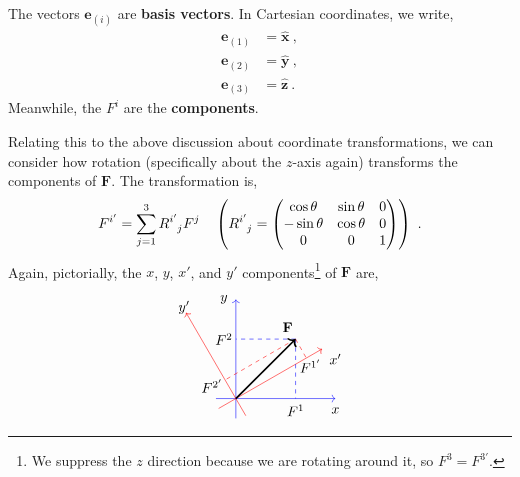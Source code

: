 \documentclass[11pt]{article}
\begin{document}
The vectors $\textbf{e}_{(i)}$ are \textbf{basis vectors}. In Cartesian coordinates, we write,
\begin{align}
\textbf{e}_{(1)} &= \hat{\textbf{x}}\ ,\\
\textbf{e}_{(2)} &= \hat{\textbf{y}}\ ,\\
\textbf{e}_{(3)} &= \hat{\textbf{z}}\ .
\end{align}
Meanwhile, the $F^i$ are the \textbf{components}.

Relating this to the above discussion about coordinate transformations, we can consider how rotation (specifically about the $z$-axis again) transforms the components of $\textbf{F}$. The transformation is,
\begin{equation}
F^{i'} = \sum_{j=1}^3 \tensor{R}{^{i'}_{j}} F^j\ \ \ \left(\tensor{R}{^{i'}_{j}} = \begin{pmatrix}
\cos\theta& \sin\theta & 0\\
-\sin\theta & \cos\theta & 0\\
0 & 0 & 1\\
\end{pmatrix}\right)\ .\label{sumComp}
\end{equation}
Again, pictorially, the $x$, $y$, $x'$, and $y'$ components\footnote{We suppress the $z$ direction because we are rotating around it, so $F^3 = F^{3'}$.} of $\textbf{F}$ are,
\[
\begin{tikzpicture}
\draw[->,color=blue] (-0.5,0,0) to (2.5,0,0);
\draw[->,color=blue] (0,-0.5,0) to (0,2.5,0);

\node at (2.5,-0.3) {$x$};
\node at (-0.3,2.5) {$y$};


\draw[->,rotate=30,color=red] (-0.5,0,0) to (2.5,0,0);
\draw[->,rotate=30,color=red] (0,-0.5,0) to (0,2.5,0);

\node at (2.5,1) {$x'$};
\node at (-1.3,2.3) {$y'$};


\draw[-,dashed,color=blue] (1.5,1.5) to (0,1.5);
\draw[-,dashed,color=blue] (1.5,1.5) to (1.5,0);
\node at (-0.3,1.5) {$F^2$};
\node at (1.5,-0.3) {$F^1$};

\draw[-,dashed,color=red] (1.5,1.5) to (-0.27,0.47);
\draw[-,dashed,color=red] (1.5,1.5) to (1.77,1.02);

\node at (1.87,0.82) {$F^{1'}$};
\node at (-0.6,0.32) {$F^{2'}$};

\draw[->,very thick] (0,0,0) to (1.5,1.5,0);
\node at (1.3,1.8,0) {$\textbf{F}$};

\end{tikzpicture}
\]
\end{document}
